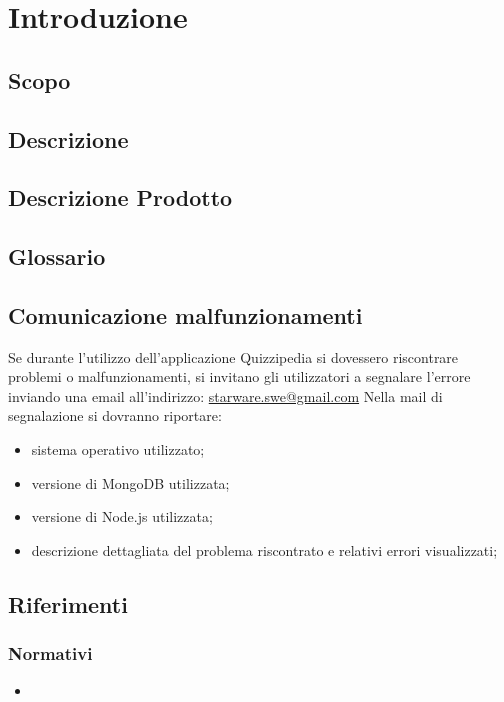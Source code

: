 \documentclass[12pt,a4paper]{article}
\begin{document}
	\newpage
	\tableofcontents
	\newpage
	\listoftables
	\listoffigures
	\newpage
	
	
	\section{Introduzione}	\label{intro}
	\TODO{}
	\subsection{Scopo}
	\TODO{}
	\subsection{Descrizione}
\TODO{}
   
	
	\subsection{Descrizione Prodotto}
	\descrizioneProdotto
	
	\subsection{Glossario}
	\glossarioPrint
	\subsection{Comunicazione malfunzionamenti}
		Se durante l’utilizzo dell’applicazione Quizzipedia si dovessero riscontrare problemi o
		malfunzionamenti, si invitano gli utilizzatori a segnalare l’errore inviando una email
		all’indirizzo:
		\url{starware.swe@gmail.com}
		Nella mail di segnalazione si dovranno riportare:
		\begin{itemize}
			\item sistema operativo utilizzato;
			\item versione di MongoDB utilizzata;
			\item versione di Node.js utilizzata;
			\item descrizione dettagliata del problema riscontrato e relativi errori visualizzati;
		\end{itemize}
	\subsection{Riferimenti}
	
	\subsubsection{Normativi}
	\begin{itemize}
		\item \TODO{}
		
	\end{itemize}
	
\end{document}
